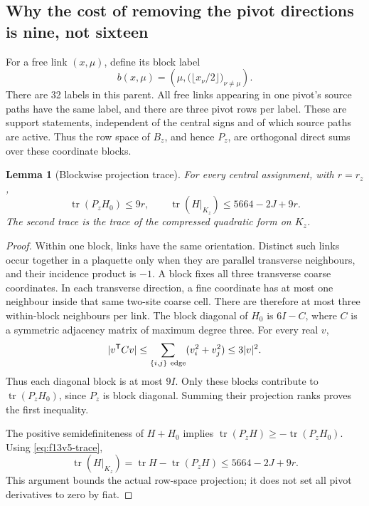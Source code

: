 \documentclass[11pt,oneside]{article}
\newtheorem{lemma}[theorem]{Lemma}
\begin{document}
\subsection{Why the cost of removing the pivot directions is nine, not sixteen}

For a free link \((x,\mu)\), define its block label
\[
 b(x,\mu)=
 \left(\mu,\big(\lfloor x_\nu/2\rfloor\big)_{\nu\ne\mu}\right).
\]
There are 32 labels in this parent. All free links
appearing in one pivot's source paths have the same
label, and there are three pivot rows per label.
These are support statements, independent of the
central signs and of which source paths are active.
Thus the row space of \(B_z\), and hence \(P_z\), are
orthogonal direct sums over these coordinate blocks.

\begin{lemma}[Blockwise projection trace]
\label{lem:f13v5-block}
For every central assignment, with \(r=r_z\),
\[
 \operatorname{tr}(P_zH_0)\le9r,\qquad
 \operatorname{tr}(H|_{K_z})\le5664-2J+9r .
\]
The second trace is the trace of the compressed
quadratic form on \(K_z\).
\end{lemma}

\begin{proof}
Within one block, links have the same orientation.
Distinct such links occur together in a plaquette
only when they are parallel transverse neighbours,
and their incidence product is \(-1\). A block fixes
all three transverse coarse coordinates. In each
transverse direction, a fine coordinate has at most
one neighbour inside that same two-site coarse cell.
There are therefore at most three within-block
neighbours per link. The block diagonal of \(H_0\)
is \(6I-C\), where \(C\) is a symmetric adjacency
matrix of maximum degree three. For every real \(v\),
\[
 |v^{\mathsf T}Cv|
 \le\sum_{\{i,j\}\ {\rm edge}}(v_i^2+v_j^2)
 \le3|v|^2 .
\]
Thus each diagonal block is at most \(9I\).
Only these blocks contribute to
\(\operatorname{tr}(P_zH_0)\), since \(P_z\) is block
diagonal. Summing their projection ranks proves the
first inequality.

The positive semidefiniteness of \(H+H_0\) implies
\(\operatorname{tr}(P_zH)\ge-\operatorname{tr}(P_zH_0)\).
Using \eqref{eq:f13v5-trace},
\[
 \operatorname{tr}(H|_{K_z})
 =\operatorname{tr}H-\operatorname{tr}(P_zH)
 \le5664-2J+9r .
\]
This argument bounds the actual row-space projection;
it does not set all pivot derivatives to zero by fiat.
\end{proof}
\end{document}
